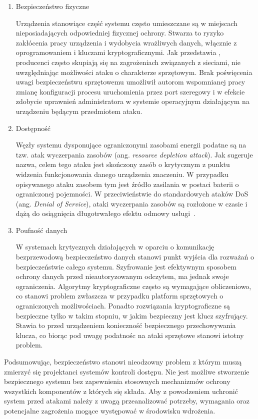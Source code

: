 		\begin{enumerate}[label=\Alph*.]
			\item Bezpieczeństwo fizyczne

				Urządzenia stanowiące część systemu często umieszczane są w miejscach nieposiadających odpowiedniej fizycznej ochrony. Stwarza to ryzyko zakłócenia pracy urządzenia i wydobycia wrażliwych danych, włącznie z oprogramowaniem i kluczami kryptograficznymi. Jak przedstawia \cite{iot-hardware-attack}, producenci często skupiają się na zagrożeniach związanych z sieciami, nie uwzględniając możliwości ataku o charakterze sprzętowym. Brak poświęcenia uwagi bezpieczeństwu sprzętowemu umożliwił autorom wspomnianej pracy zmianę konfiguracji procesu uruchomienia przez port szeregowy i w efekcie zdobycie uprawnień administratora w systemie operacyjnym działającym na urządzeniu będącym przedmiotem ataku.

			\item Dostępność

				Węzły systemu dysponujące ograniczonymi zasobami energii podatne są na tzw. atak wyczerpania zasobów (ang. \textit{resource depletion attack}). Jak sugeruje nazwa, celem tego ataku jest skończony zasób o krytycznym z punktu widzenia funkcjonowania danego urządzenia znaczeniu. W przypadku opisywanego ataku zasobem tym jest źródło zasilania w postaci baterii o ograniczonej pojemności. W przeciwieństwie do standardowych ataków DoS (ang. \textit{Denial of Service}), ataki wyczerpania zasobów są rozłożone w czasie i dążą do osiągnięcia długotrwałego efektu odmowy usługi~\cite{iot-rd-attack}.

			\item Poufność danych

				W systemach krytycznych działających w oparciu o komunikację bezprzewodową bezpieczeństwo danych stanowi punkt wyjścia dla rozważań o bezpieczeństwie całego systemu. Szyfrowanie jest efektywnym sposobem ochrony danych przed nieautoryzowanym odczytem, ma jednak swoje ograniczenia. Algorytmy kryptograficzne często są wymagające obliczeniowo, co stanowi problem zwłaszcza w przypadku platform sprzętowych o ograniczonych możliwościach. Ponadto rozwiązania kryptograficzne są bezpieczne tylko w takim stopniu, w jakim bezpieczny jest klucz szyfrujący. Stawia to przed urządzeniem konieczność bezpiecznego przechowywania klucza, co biorąc pod uwagę podatnośc na ataki sprzętowe stanowi istotny problem.

		\end{enumerate}

		Podsumowując, bezpieczeństwo stanowi nieodzowny problem z którym muszą zmierzyć się projektanci systemów kontroli dostępu. Nie jest możliwe stworzenie bezpiecznego systemu bez zapewnienia stosownych mechanizmów ochrony wszystkich komponentów z których się składa. Aby z powodzeniem uchronić system przed atakami należy z uwagą przeanalizować potrzeby, wymagania oraz potencjalne zagrożenia mogące występować w środowisku wdrożenia. 